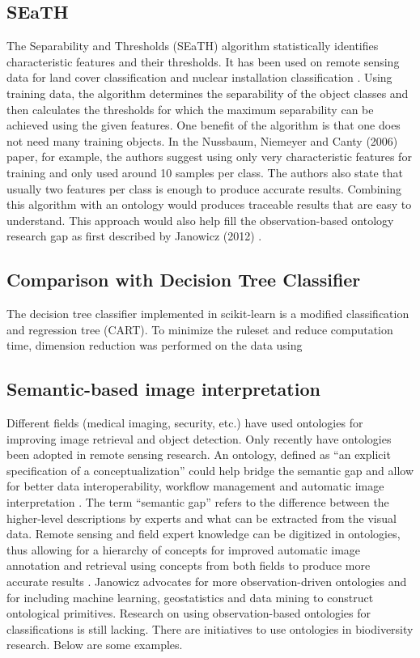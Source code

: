 \documentclass[authoryear, review,12pt,number]{elsarticle}
\begin{document}
\subsection{SEaTH} The Separability and Thresholds (SEaTH) algorithm
\citep{Nussbaum2006} statistically identifies characteristic features and their thresholds. It has
been used on remote sensing data for land cover classification \citep{Gao2011}
and nuclear installation classification \citep{Nussbaum2006}.
Using training data, the algorithm determines the separability of the object
classes and then calculates the thresholds for which the maximum separability
can be achieved using the given features. One benefit of the algorithm is that
one does not need many training objects.
In the Nussbaum, Niemeyer and Canty (2006) paper, for example, the authors
suggest using only very characteristic features for training and only used
around 10 samples per class\citep{Nussbaum2006}. The authors also state that
usually two features per class is enough to produce accurate results. Combining
this algorithm with an ontology would produces traceable results that are easy
to understand. This approach would also help fill the observation-based ontology
research gap as first described by Janowicz (2012) \citep{Janowicz2012}.

\subsection{Comparison with Decision Tree Classifier}
The decision tree classifier implemented in scikit-learn is a modified
classification and regression tree (CART)\citep{scikit-learn}. To minimize the
ruleset and reduce computation time, dimension reduction was performed on the
data using

\subsection{Semantic-based image interpretation}
Different fields (medical imaging, security, etc.) have used ontologies for
improving image retrieval and object detection. Only recently have ontologies
been adopted in remote sensing research. An ontology, defined as ``an explicit
specification of a conceptualization'' \citep{gruber1993} could help bridge the
semantic gap and allow for better data interoperability, workflow management and
automatic image interpretation \citep{Arvor2013} \citep{Andres2013a}. The term
``semantic gap'' refers to the difference between the higher-level descriptions
by experts and what can be extracted from the visual data. Remote sensing and
field expert knowledge can be digitized in ontologies, thus allowing for a
hierarchy of concepts for improved automatic image annotation and retrieval
using concepts from both fields to produce more accurate results
\citep{Srikanth:2005:EOA:1076034.1076128}. Janowicz \citep{Janowicz2012}
advocates for more observation-driven ontologies and for including machine
learning, geostatistics and data mining to construct ontological primitives.
Research on using observation-based ontologies for classifications is still
lacking. There are initiatives to use ontologies in biodiversity research. Below
are some examples.
\end{document}
